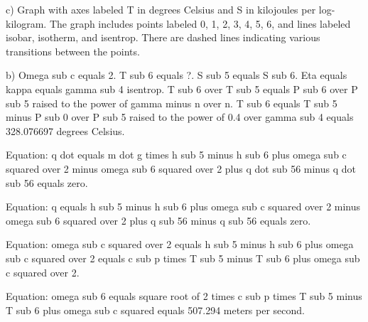 c) Graph with axes labeled T in degrees Celsius and S in kilojoules per log-kilogram. The graph includes points labeled 0, 1, 2, 3, 4, 5, 6, and lines labeled isobar, isotherm, and isentrop. There are dashed lines indicating various transitions between the points.

b) Omega sub c equals 2. T sub 6 equals ?. S sub 5 equals S sub 6. Eta equals kappa equals gamma sub 4 isentrop. T sub 6 over T sub 5 equals P sub 6 over P sub 5 raised to the power of gamma minus n over n. T sub 6 equals T sub 5 minus P sub 0 over P sub 5 raised to the power of 0.4 over gamma sub 4 equals 328.076697 degrees Celsius.

Equation: q dot equals m dot g times h sub 5 minus h sub 6 plus omega sub c squared over 2 minus omega sub 6 squared over 2 plus q dot sub 56 minus q dot sub 56 equals zero.

Equation: q equals h sub 5 minus h sub 6 plus omega sub c squared over 2 minus omega sub 6 squared over 2 plus q sub 56 minus q sub 56 equals zero.

Equation: omega sub c squared over 2 equals h sub 5 minus h sub 6 plus omega sub c squared over 2 equals c sub p times T sub 5 minus T sub 6 plus omega sub c squared over 2.

Equation: omega sub 6 equals square root of 2 times c sub p times T sub 5 minus T sub 6 plus omega sub c squared equals 507.294 meters per second.